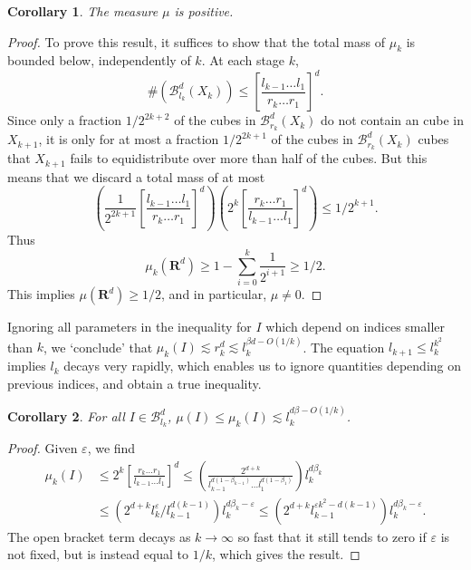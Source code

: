 \documentclass[usenames,dvipsnames]{article}
\theoremstyle{plain}
\newtheorem{corollary}{Corollary}
\theoremstyle{plain}
\begin{document}
\begin{corollary}
	The measure $\mu$ is positive.
\end{corollary}
\begin{proof}
	To prove this result, it suffices to show that the total mass of $\mu_k$ is bounded below, independently of $k$. At each stage $k$,
	\[ \# (\mathcal{B}^d_{l_k}(X_k)) \leq \left[ \frac{l_{k-1} \dots l_1}{r_k \dots r_1} \right]^d. \]
	Since only a fraction $1/2^{2k+2}$ of the cubes in $\mathcal{B}^d_{r_k}(X_k)$ do not contain an cube in $X_{k+1}$, it is only for at most a fraction $1/2^{2k+1}$ of the cubes in $\mathcal{B}^d_{r_k}(X_k)$ cubes that $X_{k+1}$ fails to equidistribute over more than half of the cubes. But this means that we discard a total mass of at most
	\[ \left( \frac{1}{2^{2k + 1}} \left[ \frac{l_{k-1} \dots l_1}{r_k \dots r_1} \right]^d \right) \left( 2^{k} \left[ \frac{r_k \dots r_1}{l_{k-1} \dots l_1} \right]^d \right) \leq 1/2^{k+1}. \]
	Thus
	\[ \mu_k(\mathbf{R}^d) \geq 1 - \sum_{i = 0}^k \frac{1}{2^{i+1}} \geq 1/2. \]
	This implies $\mu(\mathbf{R}^d) \geq 1/2$, and in particular, $\mu \neq 0$.
\end{proof}

Ignoring all parameters in the inequality for $I$ which depend on indices smaller than $k$, we `conclude' that $\mu_k(I) \lesssim r_k^d \lesssim l_k^{\beta d - O(1/k)}$. The equation $l_{k+1} \leq l_k^{k^2}$ implies $l_k$ decays very rapidly, which enables us to ignore quantities depending on previous indices, and obtain a true inequality.

\begin{corollary}
	For all $I \in \mathcal{B}^d_{l_k}$, $\mu(I) \leq \mu_k(I) \lesssim l_k^{d \beta - O(1/k)}$.
\end{corollary}
\begin{proof}
	Given $\varepsilon$, we find
	\begin{align*}
		\mu_k(I) &\leq 2^k \left[ \frac{r_k \dots r_1}{l_{k-1} \dots l_1} \right]^d \leq \left( \frac{2^{d + k}}{l_{k-1}^{d(1 - \beta_{k-1})} \dots l_1^{d(1 - \beta_1)}} \right) l_k^{d \beta_k}\\
		&\leq \left( 2^{d + k} l_k^\varepsilon / l_{k-1}^{d(k-1)} \right) l_k^{d \beta_k - \varepsilon} \leq \left( 2^{d + k} l_{k-1}^{\varepsilon k^2 - d(k - 1)} \right) l_k^{d \beta_k - \varepsilon}.
	\end{align*}
	The open bracket term decays as $k \to \infty$ so fast that it still tends to zero if $\varepsilon$ is not fixed, but is instead equal to $1/k$, which gives the result.
\end{proof}
\end{document}
